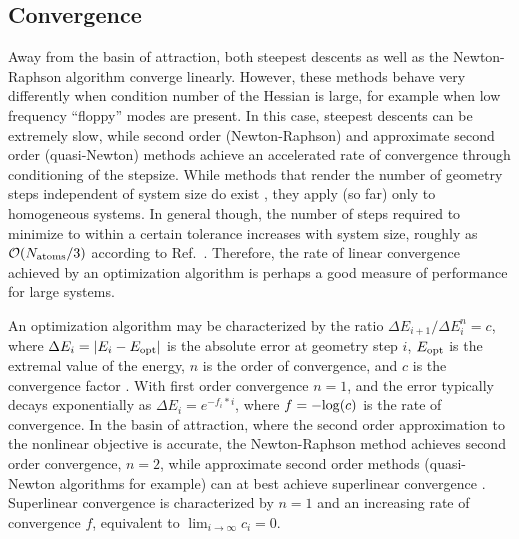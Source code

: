 \documentclass[prl,twocolumn,showpacs,twocolumngrid,superbib]{revtex4}
\begin{document}
\subsection{Convergence}

Away from the basin of attraction, both steepest descents as well as the 
Newton-Raphson algorithm converge linearly.   However, these methods behave very differently
when condition number of the Hessian is large, for example when low frequency ``floppy'' modes
are present.  In this case, steepest descents can be extremely slow, while second order 
(Newton-Raphson) and approximate second order (quasi-Newton) methods achieve an accelerated rate 
of convergence through conditioning of the stepsize.   While methods that render  the
number of geometry steps independent of system size do exist \cite{SGoedecker01}, they apply (so far) 
only to homogeneous systems.  In general though, the number of steps required to minimize to within
a certain tolerance increases with system size, roughly as ${\cal O}(N_{\rm atoms}/3)$ 
according to Ref.~.  Therefore, the rate of linear convergence achieved by an 
optimization algorithm is perhaps a good  measure of performance for large systems.  

An optimization algorithm may be characterized by the ratio ${\Delta E_{i+1}}/{\Delta E_{i}^n} =c$,
where $\Delta E_i = |E_{i}-E_{\rm opt}| $ is the absolute error at geometry step $i$,
$E_{\rm opt}$ is the extremal value of the energy, $n$ is the order of convergence, 
and $c$ is the convergence factor \cite{Quarteroni}.  With first order convergence $n=1$, and
the error typically decays exponentially as $\Delta E_i = e^{-f_i*i}$, where $f=-{\rm log}(c)$ is the 
rate of convergence. In the basin of attraction, where the second order approximation 
to the nonlinear objective is accurate, the Newton-Raphson method achieves second order convergence,
$ n=2$, while approximate second order methods (quasi-Newton algorithms for example) can 
at best achieve superlinear convergence \cite{RFletcher,Pulay_natural_internals}.   Superlinear 
convergence is characterized by $n=1$ and an increasing rate of convergence $f$, equivalent to 
$\lim_{i \to \infty} c_i = 0$.  
\end{document}
